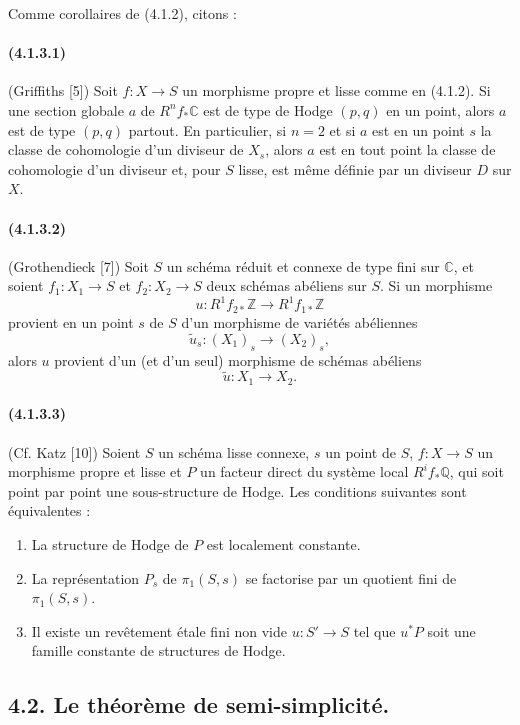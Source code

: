 \documentclass[10pt]{article}
\newcommand{\C}{\mathbb C}
\newcommand{\Q}{\mathbb Q}
\newcommand{\Z}{\mathbb Z}
\begin{document}
Comme corollaires de (4.1.2), citons :

\paragraph{(4.1.3.1)} (Griffiths [5]) Soit $f:X\to S$ un morphisme propre et lisse comme en (4.1.2). Si une section globale $a$ de $R^nf_*\C$ est de type de Hodge $(p,q)$ en un point, alors $a$ est de type $(p,q)$ partout. En particulier, si $n=2$ et si $a$ est en un point $s$ la classe
de cohomologie d'un diviseur de $X_s$, alors $a$ est en tout point la classe de cohomologie d'un diviseur et, pour $S$ lisse, est même définie par un diviseur $D$ sur $X$.

\paragraph{(4.1.3.2)} (Grothendieck [7]) Soit $S$ un schéma réduit et connexe de type fini sur $\C$, et soient $f_1:X_1\to S$ et $f_2:X_2\to S$ deux schémas abéliens sur $S$. Si un morphisme
\[
u:R^1f_{2*}\Z\longrightarrow R^1f_{1*}\Z
\]
provient en un point $s$ de $S$ d'un morphisme de variétés abéliennes
\[
\widetilde u_s:(X_1)_s\longrightarrow (X_2)_s,
\]
alors $u$ provient d'un (et d'un seul) morphisme de schémas abéliens
\[
\widetilde u:X_1\longrightarrow X_2.
\]

\paragraph{(4.1.3.3)} (Cf. Katz [10]) Soient $S$ un schéma lisse connexe, $s$ un point de $S$, $f:X\to S$ un morphisme propre et lisse et $P$ un facteur direct du système local $R^if_*\Q$, qui soit point par point une sous-structure de Hodge. Les conditions suivantes sont équivalentes :
\begin{enumerate}[label=\alph*)]
\item La structure de Hodge de $P$ est localement constante.
\item La représentation $P_s$ de $\pi_1(S,s)$ se factorise par un quotient fini de $\pi_1(S,s)$.
\item Il existe un revêtement étale fini non vide $u:S'\to S$ tel que $u^*P$ soit une famille constante de structures de Hodge.
\end{enumerate}

\subsection*{4.2. Le théorème de semi-simplicité.}
\end{document}
